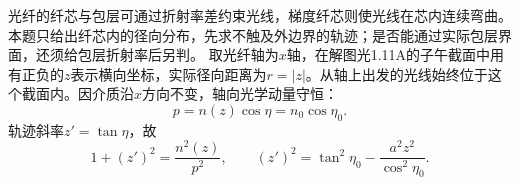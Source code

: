 \documentclass[UTF8,fontset=fandol,a4paper,11pt]{ctexart}
\begin{document}
光纤的纤芯与包层可通过折射率差约束光线，梯度纤芯则使光线在芯内连续弯曲。本题只给出纤芯内的径向分布，先求不触及外边界的轨迹；是否能通过实际包层界面，还须给包层折射率后另判。
取光纤轴为$x$轴，在解图光1.11A的子午截面中用有正负的$z$表示横向坐标，实际径向距离为$r=|z|$。从轴上出发的光线始终位于这个截面内。因介质沿$x$方向不变，轴向光学动量守恒：
\[
p=n(z)\cos\eta=n_0\cos\eta_0.
\]
轨迹斜率$z'=\tan\eta$，故
\[
1+(z')^2=\frac{n^2(z)}{p^2},\qquad
(z')^2=\tan^2\eta_0-\frac{a^2z^2}{\cos^2\eta_0}.
\]
\begin{center}\begin{minipage}{.98\linewidth}\centering
{}
\end{minipage}
\end{center}
\end{document}
